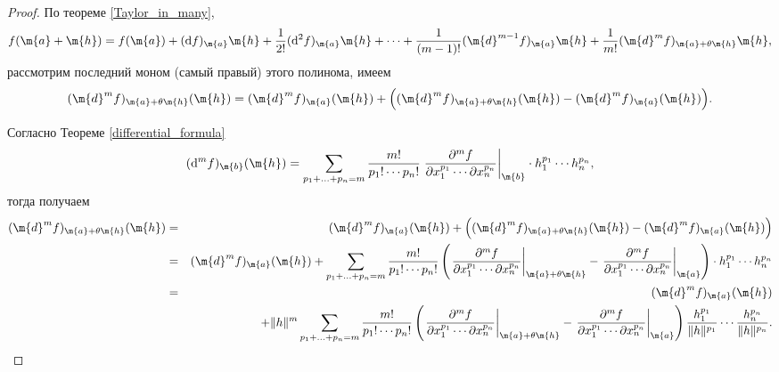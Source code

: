 \begin{proof}
    По теореме \ref{Taylor_in_many}, 
    \[
     f(\m{a} + \m{h}) = f(\m{a}) + (\mathrm{d}f)_\m{a} \m{h} + \frac{1}{2!} (\mathrm{d}^2f)_\m{a}\m{h} + \cdots + \frac{1}{(m-1)!} (\m{d}^{m-1}f)_\m{a}\m{h} + \frac{1}{m!} (\m{d}^{m}f)_{\m{a}+ \theta \m{h}}\m{h},
    \]
    рассмотрим последний моном (самый правый) этого полинома, имеем
    \[
    (\m{d}^{m}f)_{\m{a}+ \theta \m{h}}(\m{h})= (\m{d}^{m}f)_{\m{a}}(\m{h}) +  \Bigl( (\m{d}^{m}f)_{\m{a}+ \theta \m{h}}(\m{h}) - (\m{d}^{m}f)_{\m{a}} (\m{h}) \Bigr).
    \]

Согласно Теореме \ref{differential_formula}
    \[
     (\mathrm{d}^mf)_{\m{b}}(\m{h}) = \sum_{p_1 + \ldots + p_n = m} \dfrac{m!}{p_1! \cdots p_n!} \left.\frac{\partial^m f}{\partial x_1^{p_1} \cdots \partial x_n^{p_n}}\right|_{\m{b}} \cdot h_1^{p_1}\cdots h_n^{p_n},
     \]
тогда получаем
\begin{eqnarray*}
    (\m{d}^{m}f)_{\m{a}+ \theta \m{h}}(\m{h}) &=& (\m{d}^{m}f)_{\m{a}}(\m{h}) +  \Bigl( (\m{d}^{m}f)_{\m{a}+ \theta \m{h}}(\m{h}) - (\m{d}^{m}f)_{\m{a}} (\m{h}) \Bigr) \\
    &=& (\m{d}^{m}f)_{\m{a}}(\m{h}) + \sum_{p_1 + \ldots + p_n = m} \dfrac{m!}{p_1! \cdots p_n!}\left( \left.\frac{\partial^m f}{\partial x_1^{p_1} \cdots \partial x_n^{p_n}}\right|_{\m{a}+\theta \m{h}} - \left.\frac{\partial^m f}{\partial x_1^{p_1} \cdots \partial x_n^{p_n}}\right|_{\m{a}} \right)\cdot h_1^{p_1}\cdots h_n^{p_n} \\
    &=& (\m{d}^{m}f)_{\m{a}}(\m{h})\\
    &&+ \|h \|^m \sum_{p_1 + \ldots + p_n = m} \dfrac{m!}{p_1! \cdots p_n!}\left( \left.\frac{\partial^m f}{\partial x_1^{p_1} \cdots \partial x_n^{p_n}}\right|_{\m{a}+\theta \m{h}} - \left.\frac{\partial^m f}{\partial x_1^{p_1} \cdots \partial x_n^{p_n}}\right|_{\m{a}} \right) \frac{h_1^{p_1}}{\|h\|^{p_1}} \cdots \frac{h_n^{p_n}}{\|h\|^{p_n}}.
\end{eqnarray*}


\end{proof}
